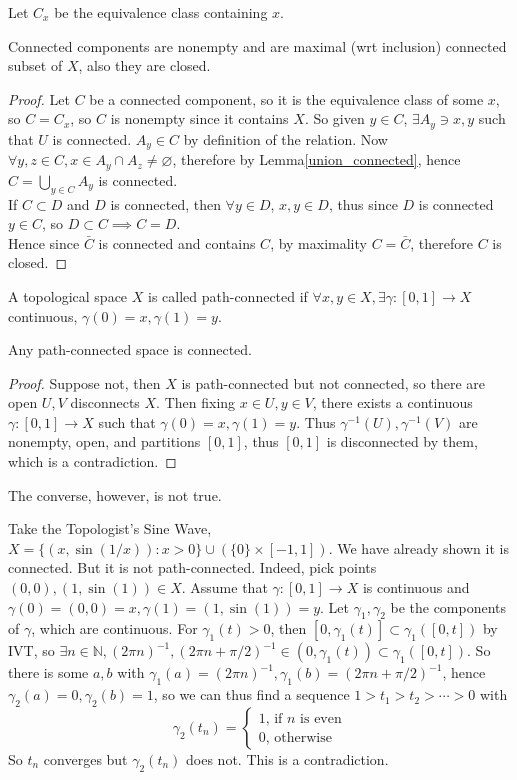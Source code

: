 Let $C_x$ be the equivalence class containing $x$.
\begin{proposition}
    Connected components are nonempty and are maximal (wrt inclusion) connected subset of $X$, also they are closed.
\end{proposition}
\begin{proof}
    Let $C$ be a connected component, so it is the equivalence class of some $x$, so $C=C_x$, so $C$ is nonempty since it contains $X$.
    So given $y\in C$, $\exists A_y\ni x,y$ such that $U$ is connected.
    $A_y\in C$ by definition of the relation.
    Now $\forall y,z\in C, x\in A_y\cap A_z\neq\varnothing$, therefore by Lemma\ref{union_connected}, hence $C=\bigcup_{y\in C}A_y$ is connected.\\
    If $C\subset D$ and $D$ is connected, then $\forall y\in D$, $x,y\in D$, thus since $D$ is connected $y\in C$, so $D\subset C\implies C=D$.\\
    Hence since $\bar C$ is connected and contains $C$, by maximality $C=\bar C$, therefore $C$ is closed.
\end{proof}
\begin{definition}
    A topological space $X$ is called path-connected if $\forall x,y\in X,\exists\gamma:[0,1]\to X$ continuous, $\gamma(0)=x,\gamma(1)=y$.
\end{definition}
\begin{theorem}
    Any path-connected space is connected.
\end{theorem}
\begin{proof}
    Suppose not, then $X$ is path-connected but not connected, so there are open $U,V$ disconnects $X$.
    Then fixing $x\in U,y\in V$, there exists a continuous $\gamma:[0,1]\to X$ such that $\gamma(0)=x,\gamma(1)=y$.
    Thus $\gamma^{-1}(U),\gamma^{-1}(V)$ are nonempty, open, and partitions $[0,1]$, thus $[0,1]$ is disconnected by them, which is a contradiction.
\end{proof}
The converse, however, is not true.
\begin{example}
    Take the Topologist's Sine Wave, $X=\{(x,\sin(1/x)):x>0\}\cup(\{0\}\times [-1,1])$.
    We have already shown it is connected.
    But it is not path-connected.
    Indeed, pick points $(0,0),(1,\sin(1))\in X$.
    Assume that $\gamma:[0,1]\to X$ is continuous and $\gamma(0)=(0,0)=x,\gamma(1)=(1,\sin(1))=y$.
    Let $\gamma_1,\gamma_2$ be the components of $\gamma$, which are continuous.
    For $\gamma_1(t)>0$, then $[0,\gamma_1(t)]\subset \gamma_1([0,t])$ by IVT, so $\exists n\in\mathbb N,(2\pi n)^{-1},(2\pi n+\pi/2)^{-1}\in (0,\gamma_1(t))\subset \gamma_1([0,t])$.
    So there is some $a,b$ with $\gamma_1(a)=(2\pi n)^{-1},\gamma_1(b)=(2\pi n+\pi/2)^{-1}$, hence $\gamma_2(a)=0,\gamma_2(b)=1$, so we can thus find a sequence $1>t_1>t_2>\cdots>0$ with
    $$\gamma_2(t_n)=
    \begin{cases}
        1\text{, if $n$ is even}\\
        0\text{, otherwise}
    \end{cases}$$
    So $t_n$ converges but $\gamma_2(t_n)$ does not.
    This is a contradiction.
\end{example}
